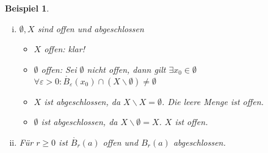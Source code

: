 \documentclass[ngerman,titlepage,twoside, parskip=half*]{scrreprt}
\theoremstyle{break}
\theoremstyle{nonumberbreak}
\newtheorem{beispiel}{Beispiel}
\begin{document}
\begin{beispiel}
  \begin{enumerate}[(i)]
  \item $\emptyset, X$ sind offen und abgeschlossen
    \begin{itemize}
      \item $X$ offen: klar!
      \item $\emptyset$ offen: Sei $\emptyset$ nicht offen, dann gilt
        $\exists x_0\in \emptyset$ \lightning $\forall \varepsilon>0\colon
        \mathring{B_{\varepsilon}}(x_0)\cap (X\backslash
        \emptyset)\neq \emptyset$\lightning 
      \item $X$ ist abgeschlossen, da $X\backslash X=\emptyset$. Die leere Menge ist offen.
      \item $\emptyset$ ist abgeschlossen, da $X\backslash \emptyset=X$. $X$ ist offen.
    \end{itemize}
  \item Für $r\geq 0$ ist $\mathring{B_r}(a)$ offen und $B_r(a)$ abgeschlossen.
\end{enumerate}
\end{beispiel}
\end{document}
